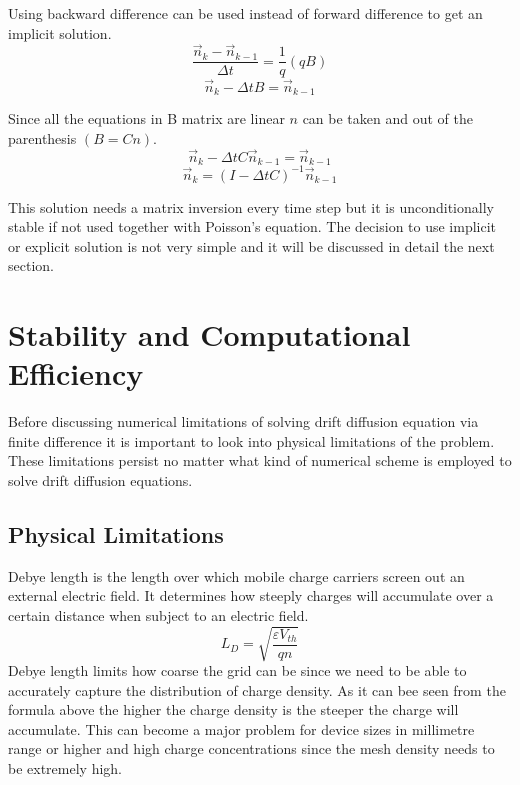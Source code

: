 \begin{doublespace}
Using backward difference can be used instead of forward difference to get an implicit solution.
\begin{equation}\nonumber
\frac{ \vec{n}_{k}-\vec{n}_{k-1}}{\Delta t}=\frac{1}{q}(qB)
\end{equation}
\begin{equation}\nonumber
\vec{n}_{k}-\Delta t B =\vec{n}_{k-1}
\end{equation}

Since all the equations in B matrix are linear  $n$ can be taken and out of the parenthesis $(B=Cn)$.
\begin{equation}\nonumber
\vec{n}_{k}-\Delta t C\vec{n}_{k-1} =\vec{n}_{k-1}
\end{equation}
\begin{equation}
\vec{n}_k=(I-\Delta t C)^{-1}\vec{n}_{k-1}
\end{equation}

This solution needs a matrix inversion every time step but it is unconditionally stable if not used together with Poisson's equation. The decision to use implicit or explicit solution is not very simple and it will be discussed in detail the next section.
\clearpage
\section{Stability and Computational Efficiency}
Before discussing numerical limitations of solving drift diffusion equation via finite difference it is important to look into physical limitations of the problem. These limitations persist no matter what kind of numerical scheme is employed to solve drift diffusion equations.

\subsection{Physical Limitations}
Debye length is the length over which mobile charge carriers screen out an external electric field. It determines how steeply charges will accumulate over a certain distance when subject to an electric field. 
\begin{equation}
L_D=\sqrt{\frac{\varepsilon V_{th}}{q n}}
\label{debye}
\end{equation}
Debye length limits how coarse the grid can be since we need to be able to accurately capture the distribution of charge density. As it can bee seen from the formula above the higher the charge density is the steeper the charge will accumulate. This can become a major problem for device sizes in millimetre range or higher and high charge concentrations since the mesh density needs to be extremely high.


\end{doublespace}
